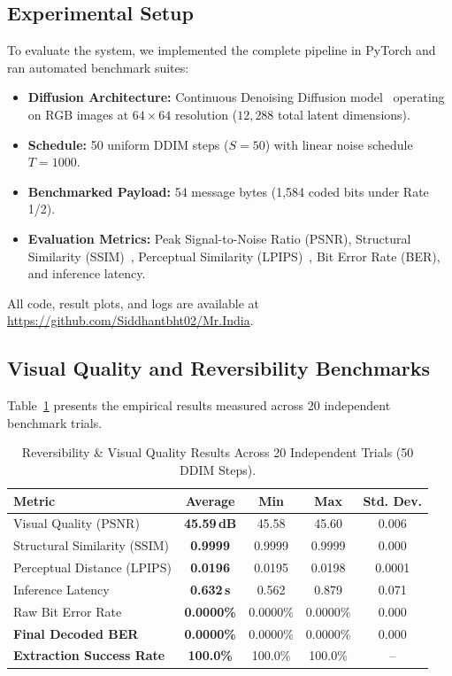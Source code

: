 \documentclass[conference]{IEEEtran}
\begin{document}
\subsection{Experimental Setup}
To evaluate the system, we implemented the complete pipeline in PyTorch and ran automated benchmark suites:
\begin{itemize}
    \item \textbf{Diffusion Architecture:} Continuous Denoising Diffusion model~\cite{ho2020denoising} operating on RGB images at $64 \times 64$ resolution ($12{,}288$ total latent dimensions).
    \item \textbf{Schedule:} 50 uniform DDIM steps ($S=50$) with linear noise schedule $T=1000$.
    \item \textbf{Benchmarked Payload:} 54 message bytes (1,584 coded bits under Rate 1/2).
    \item \textbf{Evaluation Metrics:} Peak Signal-to-Noise Ratio (PSNR), Structural Similarity (SSIM)~\cite{wang2004image}, Perceptual Similarity (LPIPS)~\cite{zhang2018unreasonable}, Bit Error Rate (BER), and inference latency.
\end{itemize}
All code, result plots, and logs are available at \url{https://github.com/Siddhantbht02/Mr.India}.

\subsection{Visual Quality and Reversibility Benchmarks}
Table~\ref{tab:reversibility_results} presents the empirical results measured across 20 independent benchmark trials.

\begin{table}[h]
\centering
\caption{Reversibility \& Visual Quality Results Across 20 Independent Trials (50 DDIM Steps).}
\label{tab:reversibility_results}
\begin{tabular}{lcccc}
\toprule
\textbf{Metric} & \textbf{Average} & \textbf{Min} & \textbf{Max} & \textbf{Std. Dev.} \\
\midrule
Visual Quality ($\mathrm{PSNR}$) & \textbf{45.59\,dB} & 45.58 & 45.60 & 0.006 \\
Structural Similarity ($\mathrm{SSIM}$) & \textbf{0.9999} & 0.9999 & 0.9999 & 0.000 \\
Perceptual Distance ($\mathrm{LPIPS}$) & \textbf{0.0196} & 0.0195 & 0.0198 & 0.0001 \\
Inference Latency & \textbf{0.632\,s} & 0.562 & 0.879 & 0.071 \\
Raw Bit Error Rate & \textbf{0.0000\%} & 0.0000\% & 0.0000\% & 0.000 \\
\textbf{Final Decoded BER} & \textbf{0.0000\%} & 0.0000\% & 0.0000\% & 0.000 \\
\textbf{Extraction Success Rate} & \textbf{100.0\%} & 100.0\% & 100.0\% & -- \\
\bottomrule
\end{tabular}
\end{table}
\end{document}
